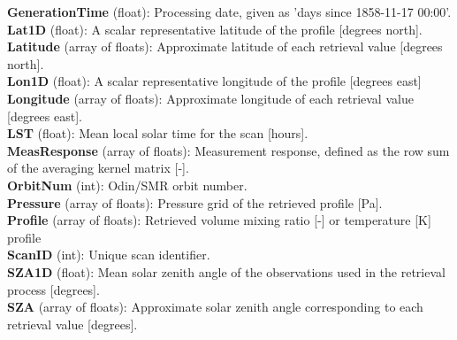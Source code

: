 \textbf{GenerationTime} (float): Processing date, given as 'days since 1858-11-17 00:00'. \\ 

\textbf{Lat1D} (float): A scalar representative latitude of the profile [degrees north]. \\ %

\textbf{Latitude} (array of floats): Approximate latitude of each retrieval value [degrees north]. \\

\textbf{Lon1D} (float): A scalar representative longitude of the profile [degrees east] \\ %

\textbf{Longitude} (array of floats): Approximate longitude of each retrieval value [degrees east]. \\

\textbf{LST} (float): Mean local solar time for the scan [hours]. \\ %

\textbf{MeasResponse} (array of floats): Measurement response, defined as the row sum of the averaging kernel matrix [-]. \\ %

\textbf{OrbitNum} (int): Odin/SMR orbit number. \\ %

\textbf{Pressure} (array of floats): Pressure grid of the retrieved profile [Pa]. \\

\textbf{Profile} (array of floats): Retrieved volume mixing ratio [-] or temperature [K] profile  \\ %

\textbf{ScanID} (int): Unique scan identifier. \\

\textbf{SZA1D} (float): Mean solar zenith angle of the observations used in the retrieval process [degrees]. \\

\textbf{SZA} (array of floats): Approximate solar zenith angle corresponding to each retrieval value [degrees]. \\ %

